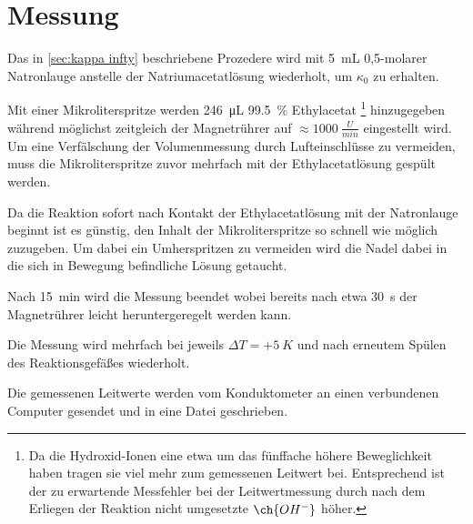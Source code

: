 	\section{Messung}
		Das in \cref{sec:kappa infty} beschriebene Prozedere wird mit \SI{5}{mL} 0,5-molarer Natronlauge anstelle der
		Natriumacetatlösung wiederholt, um \(\kappa_0\) zu erhalten.\par
		Mit einer Mikroliterspritze werden \SI{246}{\micro L} \SI{99,5}{\percent} Ethylacetat \footnote{Da die Hydroxid-Ionen eine etwa um das fünffache
		höhere Beweglichkeit haben tragen sie viel mehr zum gemessenen Leitwert bei. Entsprechend ist der zu erwartende Messfehler
		bei der Leitwertmessung durch nach dem Erliegen der Reaktion nicht umgesetzte \(\ch{OH^-}\) höher.} hinzugegeben während möglichst zeitgleich
		der Magnetrührer auf \(\approx \SI{1000}{\frac{U}{min}}\) eingestellt wird. Um eine Verfälschung der Volumenmessung durch
		Lufteinschlüsse zu vermeiden, muss die Mikroliterspritze zuvor mehrfach mit der Ethylacetatlösung gespült werden.\par
		Da die Reaktion sofort nach Kontakt der Ethylacetatlösung mit der Natronlauge beginnt ist es günstig, den Inhalt der
		Mikroliterspritze so schnell wie möglich zuzugeben. Um dabei ein Umherspritzen zu vermeiden wird die Nadel dabei in
		die sich in Bewegung befindliche Lösung getaucht.\par
		Nach \SI{15}{\minute} wird die Messung beendet wobei bereits nach etwa \SI{30}{s} der Magnetrührer leicht heruntergeregelt
		werden kann.\par
		Die Messung wird mehrfach bei jeweils \(\Delta T = +\SI{5}{K}\) und nach erneutem Spülen des Reaktionsgefäßes wiederholt.\par\medskip
		Die gemessenen Leitwerte werden vom Konduktometer an einen verbundenen Computer gesendet und in eine Datei geschrieben.